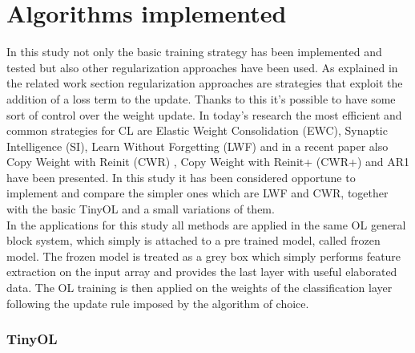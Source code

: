 \documentclass[12pt]{report}
\begin{document}
\section{Algorithms implemented}
In this study not only the basic training strategy has been implemented and tested but also other regularization approaches have been used. As explained in the related work section regularization approaches are strategies that exploit the addition of a loss term to the update. Thanks to this it's possible to have some sort of control over the weight update. In today's research the most efficient and common strategies for CL are Elastic Weight Consolidation (EWC), Synaptic Intelligence (SI), Learn Without Forgetting (LWF) \autocite{li2017learning} and in a recent paper also Copy Weight with Reinit (CWR) \autocite{lomonaco2017core50}, Copy Weight with Reinit+ (CWR+) \autocite{maltoni2019continuous} and AR1 \autocite{maltoni2019continuous} have been presented. In this study it has been considered opportune to implement and compare the simpler ones which are LWF and CWR, together with the basic TinyOL and a small variations of them. \\
In the applications for this study all methods are applied in the same OL general block system, which simply is attached to a pre trained model, called frozen model. The frozen model is treated as a grey box which simply performs feature extraction on the input array and provides the last layer with useful elaborated data. The OL training is then applied on the weights of the classification layer following the update rule imposed by the algorithm of choice.

\subsubsection{TinyOL}
\end{document}
